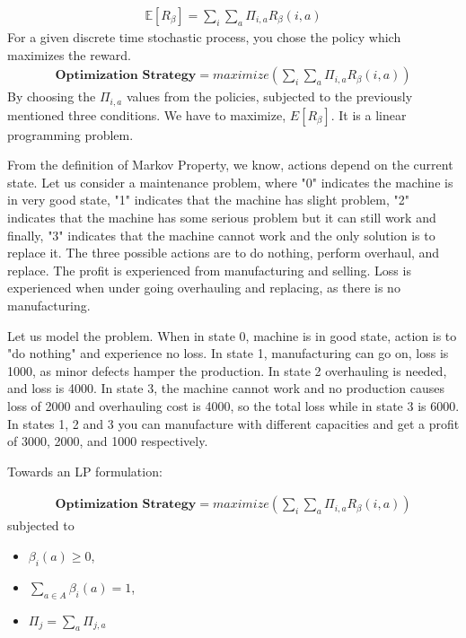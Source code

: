 \begin{align*}
    \mathbb{E}[R_\beta]=\sum_i \sum_a \Pi_{i,a}R_\beta(i,a)
\end{align*}
For a given discrete time stochastic process, you chose the policy which maximizes the reward. 
\begin{align*}
    \textbf{Optimization Strategy}=maximize(\sum_i \sum_a \Pi_{i,a}R_\beta(i,a))
\end{align*}
By choosing the $\Pi_{i,a}$ values from the policies, subjected to the previously mentioned three conditions. We have to maximize, $E[R_{\beta}]$. It is a linear programming problem.

From the definition of Markov Property, we know, actions depend on the current state. Let us consider a maintenance problem, where "0" indicates the machine is in very good state, "1" indicates that the machine has slight problem, "2" indicates that the machine has some serious problem but it can still work and finally, "3" indicates that the machine cannot work and the only solution is to replace it. The three possible actions are to do nothing, perform overhaul, and replace. The profit is experienced from manufacturing and selling. Loss is experienced when under going overhauling and replacing, as there is no manufacturing.     

Let us model the problem. When in state 0, machine is in good state, action is to "do nothing" and experience no loss. In state 1, manufacturing can go on, loss is 1000, as minor defects hamper the production. In state 2 overhauling is needed, and loss is 4000. In state 3, the machine cannot work and no production causes loss of 2000 and overhauling cost is 4000, so the total loss while in state 3 is 6000. In states 1, 2 and 3 you can manufacture with different capacities and get a profit of 
3000, 2000, and 1000 respectively.

Towards an LP formulation: 

\begin{align*}
    \textbf{Optimization Strategy}=maximize(\sum_i \sum_a \Pi_{i,a}R_\beta(i,a))
\end{align*}
subjected to 

\begin{itemize}
    \item $\beta_i(a) \geq 0$, 
    \item $\sum_{a\in A}\beta_i(a)=1$, 
    
    \item $\Pi_j=\sum_a\Pi_{j,a}$
\end{itemize}

